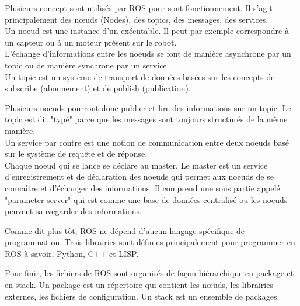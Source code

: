Plusieurs concept sont utilisés par ROS pour sont fonctionnement. Il s'agit principalement des nœuds (Nodes), des topics, des messages, des services. \\

Un noeud est une instance d'un exécutable. Il peut par exemple correspondre à un capteur ou à un moteur présent sur le robot.\\

L'échange d'informations entre les noeuds se font de manière asynchrone par un topic ou de manière synchrone par un service.\\

Un topic est un système de transport de données basées sur les concepts de subscribe (abonnement) et de publish (publication).

Plusieurs noeuds pourront donc publier et lire des informations sur un topic. Le topic est dit "typé" parce que les messages sont toujours structurés de la même manière.\\

Un service par contre est une notion de communication entre deux noeuds basé sur le système de requête et de réponse.\\

Chaque noeud qui se lance se déclare au master.
Le master est un service d'enregistrement et de déclaration des noeuds qui permet aux noeuds de se connaître et d'échanger des informations. Il comprend une sous partie appelé "parameter server" qui est comme une base de données centralisé ou les noeuds peuvent sauvegarder des informations.\\



Comme dit plus tôt, ROS ne dépend d’aucun langage spécifique de programmation. Trois librairies sont définies principalement pour programmer en ROS à savoir, Python, C++ et LISP.

Pour finir, les fichiers de ROS sont organisés  de façon hiérarchique en package et en stack. Un package est un répertoire qui contient les nœuds, les librairies externes, les fichiers de configuration. Un stack est un ensemble de packages.



